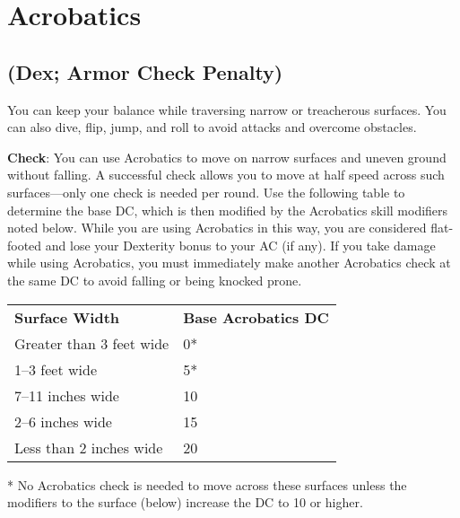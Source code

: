 \section{Acrobatics}

\label{f0}				
\subsection{(Dex; Armor Check Penalty)}

				
You can keep your balance while traversing narrow or treacherous surfaces. You can also dive, flip, jump, and roll to avoid attacks and overcome obstacles.
				
\textbf{Check}: You can use Acrobatics to move on narrow surfaces and uneven ground without falling. A successful check allows you to move at half speed across such surfaces---only one check is needed per round. Use the following table to determine the base DC, which is then modified by the Acrobatics skill modifiers noted below. While you are using Acrobatics in this way, you are considered flat-footed and lose your Dexterity bonus to your AC (if any). If you take damage while using Acrobatics, you must immediately make another Acrobatics check at the same DC to avoid falling or being knocked prone.

\begin{table}
 \sffamily
 \begin{tabular}{ll}
  \textbf{Surface Width} & \textbf{Base Acrobatics DC} \\
Greater than 3 feet wide & 0* \\
1--3 feet wide & 5* \\
7--11 inches wide & 10\\
2--6 inches wide & 15 \\
Less than 2 inches wide & 20\\
 \end{tabular}
 * No Acrobatics check is needed to move across these surfaces unless the modifiers to the surface (below) increase the DC to 10 or higher.
\end{table}
				
